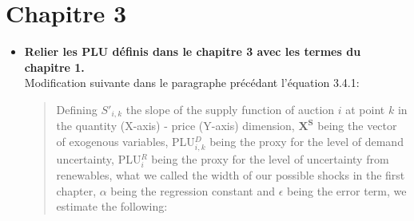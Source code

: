 \documentclass{article}
\begin{document}
\section{Chapitre 3}


\begin{itemize}

\item \textbf{Relier les PLU définis dans le chapitre 3 avec les termes du chapitre 1.}\\

Modification suivante dans le paragraphe précédant l'équation 3.4.1:

\begin{quote}
Defining $S'_{i,k}$ the slope of the supply function of auction $i$ at point $k$ in the quantity (X-axis) - price (Y-axis) dimension, $\boldsymbol{X^S}$ being the vector of exogenous variables, PLU$^D_{i,k}$ being the proxy for the level of demand uncertainty, PLU$^R_i$ being the proxy for the level of uncertainty from renewables, what we called the width of our possible shocks in the first chapter, $\alpha$ being the regression constant and $\epsilon$ being the error term, we estimate the following:
\end{quote}

\end{itemize}
\end{document}
